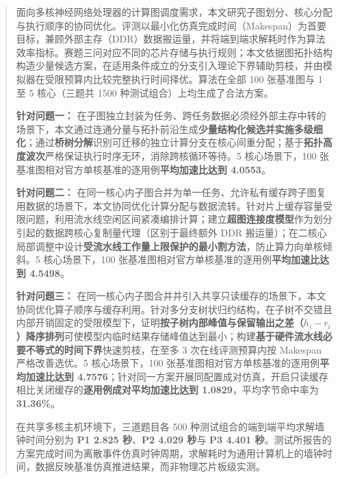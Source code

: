 \documentclass[anonymous,withtoc]{gmcm2026}
\begin{document}
\maketitle
\begin{abstract}
面向多核神经网络处理器的计算图调度需求，本文研究子图划分、核心分配与执行顺序的协同优化。评测以最小化仿真完成时间（Makespan）为首要目标，兼顾外部主存（DDR）数据搬运量，并将端到端求解耗时作为算法效率指标。赛题三问对应不同的芯片存储与执行规则；本文依据图拓扑结构构造少量候选方案，在适用条件成立的分支引入理论下界辅助剪枝，并由模拟器在受限预算内比较完整执行时间择优。算法在全部 100 张基准图与 1 至 5 核心（三题共 1500 种测试组合）上均生成了合法方案。

\textbf{针对问题一：} 在子图独立封装为任务、跨任务数据必须经外部主存中转的场景下，本文通过连通分量与拓扑前沿生成\textbf{少量结构化候选并实施多级细化}；通过\textbf{桥树分解}识别可迁移的独立计算分支在核心间重分配；基于\textbf{拓扑高度波次}严格保证执行时序无环，消除跨核循环等待。5 核心场景下，100 张基准图相对官方单核基准的逐用例\textbf{平均加速比达到 4.0553}。

\textbf{针对问题二：} 在同一核心内子图合并为单一任务、允许私有缓存跨子图复用数据的场景下，本文协同优化计算分配与数据流转。针对片上缓存容量受限问题，利用流水线空闲区间紧凑编排计算；建立\textbf{超图连接度模型}作为划分引起的数据跨核心复制量代理（区别于最终额外 DDR 搬运量）；在二核心局部调整中设计\textbf{受流水线工作量上限保护的最小割方法}，防止算力向单核倾斜。5 核心场景下，100 张基准图相对官方单核基准的逐用例\textbf{平均加速比达到 4.5498}。

\textbf{针对问题三：} 在同一核心内子图合并并引入共享只读缓存的场景下，本文协同优化算子顺序与缓存利用。针对多分支树状归约结构，在子树不交错且内部开销固定的受限模型下，证明\textbf{按子树内部峰值与保留输出之差（\(h_i - r_i\)）降序排列}可使模型内临时结果存储峰值达到最小；构建\textbf{基于硬件流水线必要不等式的时间下界}快速剪枝，在至多 3 次在线评测预算内按 Makespan 严格改善选优。5 核心场景下，100 张基准图相对官方单核基准的逐用例\textbf{平均加速比达到 4.7576}；针对同一方案开展同配置成对仿真，开启只读缓存相比关闭缓存的\textbf{逐用例成对平均加速比达到 1.0829}，平均字节命中率为 \textbf{31.36\%}。

在共享多核主机环境下，三道题目各 500 种测试组合的端到端平均求解墙钟时间分别为 \textbf{P1 2.825 秒}、\textbf{P2 4.029 秒}与 \textbf{P3 4.401 秒}。测试所报告的方案完成时间为离散事件仿真时钟周期，求解耗时为通用计算机上的墙钟时间，数据反映基准仿真推进结果，而非物理芯片板级实测。
\end{abstract}
\maketoc
\end{document}
